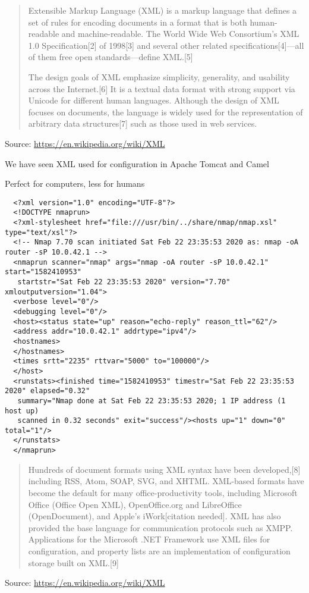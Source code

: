 \documentclass[Screen16to9,17pt]{foils}
\begin{document}
\begin{quote}
  Extensible Markup Language (XML) is a markup language that defines a set of rules for encoding documents in a format that is both human-readable and machine-readable. The World Wide Web Consortium's XML 1.0 Specification[2] of 1998[3] and several other related specifications[4]—all of them free open standards—define XML.[5]

  The design goals of XML emphasize simplicity, generality, and usability across the Internet.[6] It is a textual data format with strong support via Unicode for different human languages. Although the design of XML focuses on documents, the language is widely used for the representation of arbitrary data structures[7] such as those used in web services.
\end{quote}
Source: \url{https://en.wikipedia.org/wiki/XML}

\begin{list2}
\item We have seen XML used for configuration in Apache Tomcat and Camel
\item Perfect for computers, less for humans
\end{list2}


\begin{verbatim}
  <?xml version="1.0" encoding="UTF-8"?>
  <!DOCTYPE nmaprun>
  <?xml-stylesheet href="file:///usr/bin/../share/nmap/nmap.xsl" type="text/xsl"?>
  <!-- Nmap 7.70 scan initiated Sat Feb 22 23:35:53 2020 as: nmap -oA router -sP 10.0.42.1 -->
  <nmaprun scanner="nmap" args="nmap -oA router -sP 10.0.42.1" start="1582410953"
   startstr="Sat Feb 22 23:35:53 2020" version="7.70" xmloutputversion="1.04">
  <verbose level="0"/>
  <debugging level="0"/>
  <host><status state="up" reason="echo-reply" reason_ttl="62"/>
  <address addr="10.0.42.1" addrtype="ipv4"/>
  <hostnames>
  </hostnames>
  <times srtt="2235" rttvar="5000" to="100000"/>
  </host>
  <runstats><finished time="1582410953" timestr="Sat Feb 22 23:35:53 2020" elapsed="0.32"
   summary="Nmap done at Sat Feb 22 23:35:53 2020; 1 IP address (1 host up)
   scanned in 0.32 seconds" exit="success"/><hosts up="1" down="0" total="1"/>
  </runstats>
  </nmaprun>
\end{verbatim}



\begin{quote}
Hundreds of document formats using XML syntax have been developed,[8] including RSS, Atom, SOAP, SVG, and XHTML. XML-based formats have become the default for many office-productivity tools, including Microsoft Office (Office Open XML), OpenOffice.org and LibreOffice (OpenDocument), and Apple's iWork[citation needed]. XML has also provided the base language for communication protocols such as XMPP. Applications for the Microsoft .NET Framework use XML files for configuration, and property lists are an implementation of configuration storage built on XML.[9]
\end{quote}
Source: \url{https://en.wikipedia.org/wiki/XML}
\end{document}
